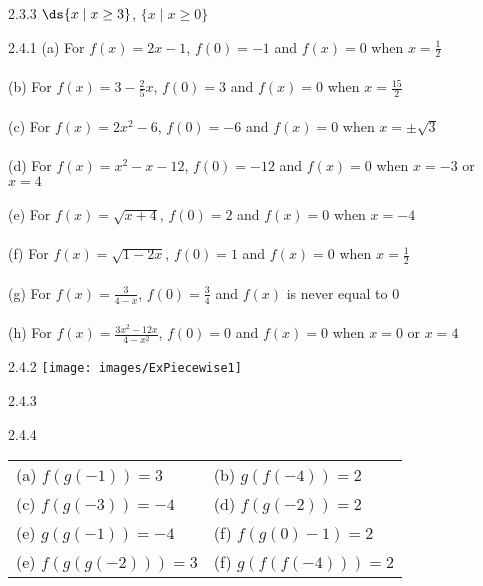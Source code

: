 \begin{Answer}{2.3.3}
			$\ds \{x\mid x\ge3\}$, $\{x\mid x\ge0\}$
		
\end{Answer}
\begin{Answer}{2.4.1}
				(a) \hspace{2mm} For $f(x) = 2x-1$,  $f(0) = -1$ and $f(x) = 0$ when $x = \frac{1}{2}$\\
				\\
				(b) \hspace{2mm}  For $f(x) =  3 - \frac{2}{5} x$, $f(0) = 3$ and $f(x) = 0$ when $x = \frac{15}{2}$\\
				\\
				(c) \hspace{2mm} For $f(x) =  2x^2-6$, $f(0) = -6$ and $f(x) = 0$ when $x = \pm \sqrt{3}$\\
				\\
				(d) \hspace{2mm} For $f(x) =  x^2-x-12$, $f(0) = -12$ and $f(x) = 0$ when $x = -3$ or $x=4$\\
				\\
				(e) \hspace{2mm} For $f(x) =  \sqrt{x+4}$, $f(0) = 2$ and $f(x) = 0$ when $x =-4$\\
				\\
				(f) \hspace{2mm} For $f(x) =  \sqrt{1-2x}$, $f(0) = 1$ and $f(x) = 0$ when $x = \frac{1}{2}$\\
				\\
				(g) \hspace{2mm} For $f(x) =   \frac{3}{4-x}$, $f(0) = \frac{3}{4}$ and $f(x)$ is never equal to $0$\\
				\\
				(h) \hspace{2mm} For $f(x) =   \frac{3x^2-12x}{4-x^2}$, $f(0) =0$ and $f(x) = 0$ when $x=0$ or $x=4$\\


			
\end{Answer}
\begin{Answer}{2.4.2}
				\texttt{[image: images/ExPiecewise1]}
			
\end{Answer}
\begin{Answer}{2.4.3}
            
\end{Answer}
\begin{Answer}{2.4.4}
				\begin{tabular}{ll}
					(a) $f(g(-1))=3$ \hspace{1mm} & (b) $g(f(-4))=2$ \hspace{1mm} \\
					(c) $f(g(-3))=-4$ & (d) $f(g(-2))=2$ \\
					(e) $g(g(-1))=-4$ &  (f) $f(g(0)-1)=2$ \\
					(e) $f(g(g(-2)))=3$ \hspace{1mm} & (f) $g(f(f(-4)))=2$ \\
				\end{tabular}

			
\end{Answer}
